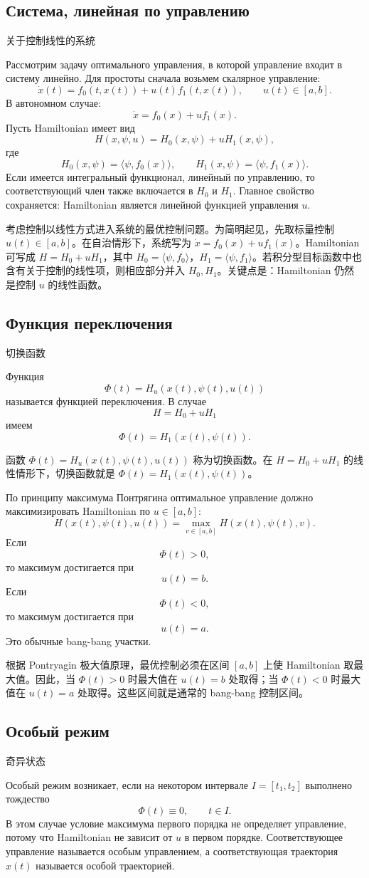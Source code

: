 \documentclass[12pt,a4paper]{article}
\newcommand{\zh}[1]{\par\noindent #1\par}
\begin{document}

\subsection*{Система, линейная по управлению}
\zh{关于控制线性的系统}
Рассмотрим задачу оптимального управления, в которой управление входит в систему линейно. Для простоты сначала возьмем скалярное управление:
\[
\dot x(t)=f_0(t,x(t))+u(t)f_1(t,x(t)),
\qquad u(t)\in [a,b].
\]
В автономном случае:
\[
\dot x=f_0(x)+u f_1(x).
\]
Пусть Hamiltonian имеет вид
\[
H(x,\psi,u)=H_0(x,\psi)+uH_1(x,\psi),
\]
где
\[
H_0(x,\psi)=\langle \psi,f_0(x)\rangle,
\qquad
H_1(x,\psi)=\langle \psi,f_1(x)\rangle.
\]
Если имеется интегральный функционал, линейный по управлению, то соответствующий член также включается в $H_0$ и $H_1$. Главное свойство сохраняется: Hamiltonian является линейной функцией управления $u$.
\zh{考虑控制以线性方式进入系统的最优控制问题。为简明起见，先取标量控制 \(u(t)\in[a,b]\)。在自治情形下，系统写为 \(\dot x=f_0(x)+u f_1(x)\)。Hamiltonian 可写成 \(H=H_0+uH_1\)，其中 \(H_0=\langle\psi,f_0\rangle\)，\(H_1=\langle\psi,f_1\rangle\)。若积分型目标函数中也含有关于控制的线性项，则相应部分并入 \(H_0,H_1\)。关键点是：Hamiltonian 仍然是控制 \(u\) 的线性函数。}

\subsection*{Функция переключения}
\zh{切换函数}
Функция
\[
\Phi(t)=H_u(x(t),\psi(t),u(t))
\]
называется функцией переключения. В случае
\[
H=H_0+uH_1
\]
имеем
\[
\Phi(t)=H_1(x(t),\psi(t)).
\]
\zh{函数 \(\Phi(t)=H_u(x(t),\psi(t),u(t))\) 称为切换函数。在 \(H=H_0+uH_1\) 的线性情形下，切换函数就是 \(\Phi(t)=H_1(x(t),\psi(t))\)。}

По принципу максимума Понтрягина оптимальное управление должно максимизировать Hamiltonian по $u\in[a,b]$:
\[
H(x(t),\psi(t),u(t))=
\max_{v\in[a,b]}H(x(t),\psi(t),v).
\]
Если
\[
\Phi(t)>0,
\]
то максимум достигается при
\[
u(t)=b.
\]
Если
\[
\Phi(t)<0,
\]
то максимум достигается при
\[
u(t)=a.
\]
Это обычные bang-bang участки.
\zh{根据 Pontryagin 极大值原理，最优控制必须在区间 \([a,b]\) 上使 Hamiltonian 取最大值。因此，当 \(\Phi(t)>0\) 时最大值在 \(u(t)=b\) 处取得；当 \(\Phi(t)<0\) 时最大值在 \(u(t)=a\) 处取得。这些区间就是通常的 bang-bang 控制区间。}

\subsection*{Особый режим}
\zh{奇异状态}
Особый режим возникает, если на некотором интервале $I=[t_1,t_2]$ выполнено тождество
\[
\Phi(t)\equiv0,
\qquad t\in I.
\]
В этом случае условие максимума первого порядка не определяет управление, потому что Hamiltonian не зависит от $u$ в первом порядке. Соответствующее управление называется особым управлением, а соответствующая траектория $x(t)$ называется особой траекторией.
\end{document}
